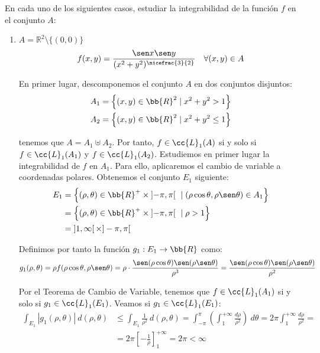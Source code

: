 \begin{ejercicio}
    En cada uno de los siguientes casos, estudiar la integrabilidad de la función \( f \) en el conjunto \( A \):

    \begin{enumerate}
        \item \( A = \mathbb{R}^2 \setminus \{(0, 0)\} \)
        \[ f(x, y) = \frac{\sen x \sen y}{(x^2 + y^2)^{\nicefrac{3}{2}}} \quad \forall (x, y) \in A \]

        En primer lugar, descomponemos el conjunto $A$ en dos conjuntos disjuntos:
        \begin{align*}
            A_1 &= \left\{ (x, y) \in \bb{R}^2 \mid x^2 + y^2 > 1 \right\} \\
            A_2 &= \left\{ (x, y) \in \bb{R}^2 \mid x^2 + y^2 \leq 1 \right\}
        \end{align*}

        tenemos que $A=A_1 \uplus A_2$. Por tanto, $f\in \cc{L}_1(A)$ si y solo si $f\in \cc{L}_1(A_1)$ y $f\in \cc{L}_1(A_2)$. Estudiemos en primer lugar la integrabilidad de $f$ en $A_1$.
        Para ello, aplicaremos el cambio de variable a coordenadas polares. Obtenemos el conjunto $E_1$ siguiente:
        \begin{align*}
            E_1 &= \left\{ (\rho, \theta) \in \bb{R}^+\times \left]-\pi, \pi\right[ ~\mid (\rho\cos\theta, \rho\sen\theta) \in A_1 \right\} \\
            &= \left\{ (\rho, \theta) \in \bb{R}^+\times \left]-\pi, \pi\right[ ~\mid \rho > 1 \right\} \\
            &= \left]1,\infty\right[\times ]-\pi, \pi[
        \end{align*}

        Definimos por tanto la función $g_1: E_1 \to \bb{R}$ como:
        \begin{equation*}
            g_1(\rho, \theta) = \rho f(\rho\cos\theta, \rho\sen\theta) = \rho\cdot \frac{\sen(\rho\cos\theta) \sen(\rho\sen\theta)}{\rho^3}
            = \frac{\sen(\rho\cos\theta) \sen(\rho\sen\theta)}{\rho^2}
        \end{equation*}

        Por el Teorema de Cambio de Variable, tenemos que $f\in \cc{L}_1(A_1)$ si y solo si $g_1\in \cc{L}_1(E_1)$. Veamos si $g_1\in \cc{L}_1(E_1)$:
        \begin{align*}
            \int_{E_1} |g_1(\rho, \theta)|~d(\rho, \theta)
            &\leq \int_{E_1} \frac{1}{\rho^2}~d(\rho, \theta)
            = \int_{-\pi}^\pi \left( \int_1^{+\infty} \frac{d\rho}{\rho^2} \right)~d\theta
            = 2\pi \int_1^{+\infty} \frac{d\rho}{\rho^2} =\\
            &= 2\pi \left[ -\frac{1}{\rho} \right]_1^{+\infty} = 2\pi < \infty
        \end{align*}
        

\end{enumerate}
\end{ejercicio}

